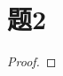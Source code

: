 \documentclass[cn]{homework}
\begin{document}
    \section{题2}
    \begin{proof}






    \end{proof}
\end{document}
